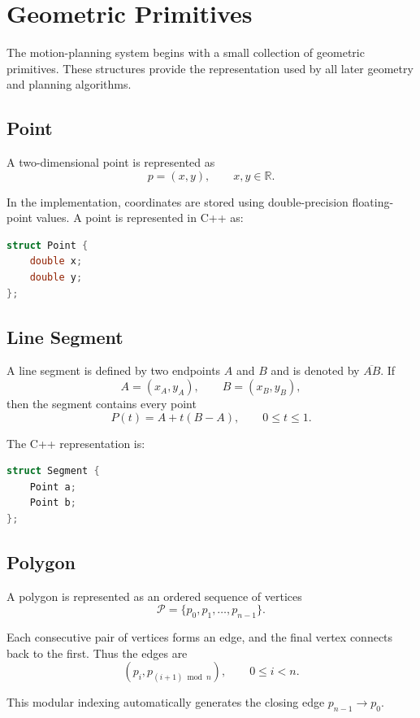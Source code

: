 \section{Geometric Primitives}

The motion-planning system begins with a small collection of geometric
primitives. These structures provide the representation used by all later
geometry and planning algorithms.

\subsection{Point}

A two-dimensional point is represented as
\[
p=(x,y), \qquad x,y\in\mathbb{R}.
\]

In the implementation, coordinates are stored using double-precision
floating-point values. A point is represented in C++ as:

\begin{lstlisting}[language=C++]
struct Point {
    double x;
    double y;
};
\end{lstlisting}

\subsection{Line Segment}

A line segment is defined by two endpoints $A$ and $B$ and is denoted by
$\overline{AB}$. If
\[
A=(x_A,y_A), \qquad B=(x_B,y_B),
\]
then the segment contains every point
\[
P(t)=A+t(B-A), \qquad 0\leq t\leq 1.
\]

The C++ representation is:

\begin{lstlisting}[language=C++]
struct Segment {
    Point a;
    Point b;
};
\end{lstlisting}

\subsection{Polygon}

A polygon is represented as an ordered sequence of vertices
\[
\mathcal{P}=\{p_0,p_1,\ldots,p_{n-1}\}.
\]

Each consecutive pair of vertices forms an edge, and the final vertex
connects back to the first. Thus the edges are
\[
\left(p_i,p_{(i+1)\bmod n}\right), \qquad 0\leq i<n.
\]

This modular indexing automatically generates the closing edge
$p_{n-1}\rightarrow p_0$.


